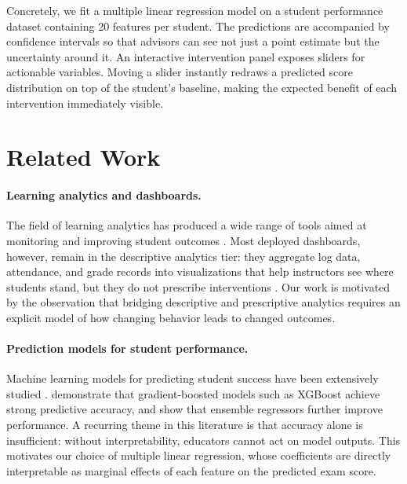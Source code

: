 \documentclass[11pt]{article}
\begin{document}
Concretely, we fit a multiple linear regression model on a student performance dataset containing 20 features per student. The predictions are accompanied by confidence intervals so that advisors can see not just a point estimate but the uncertainty around it. An interactive intervention panel exposes sliders for actionable variables. Moving a slider instantly redraws a predicted score distribution on top of the student's baseline, making the expected benefit of each intervention immediately visible.

\section{Related Work}
\label{sec:related}

\paragraph{Learning analytics and dashboards.}
The field of learning analytics has produced a wide range of tools aimed at monitoring and improving student outcomes \cite{siemens2013learning}. Most deployed dashboards, however, remain in the descriptive analytics tier: they aggregate log data, attendance, and grade records into visualizations that help instructors see where students stand, but they do not prescribe interventions \cite{papamitsiou2014learning}. Our work is motivated by the observation that bridging descriptive and prescriptive analytics requires an explicit model of how changing behavior leads to changed outcomes.

\paragraph{Prediction models for student performance.}
Machine learning models for predicting student success have been extensively studied \cite{romero2020educational}. \citet{asselman2023} demonstrate that gradient-boosted models such as XGBoost achieve strong predictive accuracy, and \citet{khalaf2025} show that ensemble regressors further improve performance. A recurring theme in this literature is that accuracy alone is insufficient: without interpretability, educators cannot act on model outputs. This motivates our choice of multiple linear regression, whose coefficients are directly interpretable as marginal effects of each feature on the predicted exam score.
\end{document}
